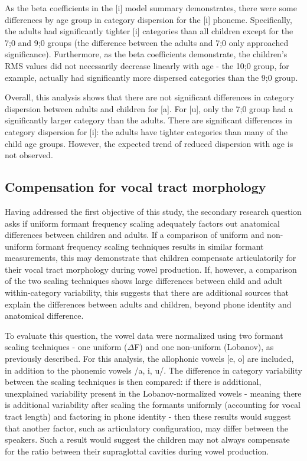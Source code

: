 \documentclass[
]{article}
\begin{document}
As the beta coefficients in the {[}i{]} model summary demonstrates, there were some differences by age group in category dispersion for the {[}i{]} phoneme. Specifically, the adults had significantly tighter {[}i{]} categories than all children except for the 7;0 and 9;0 groups (the difference between the adults and 7;0 only approached significance). Furthermore, as the beta coefficients demonstrate, the children's RMS values did not necessarily decrease linearly with age - the 10;0 group, for example, actually had significantly more dispersed categories than the 9;0 group.

Overall, this analysis shows that there are not significant differences in category dispersion between adults and children for {[}a{]}. For {[}u{]}, only the 7;0 group had a significantly larger category than the adults. There are significant differences in category dispersion for {[}i{]}: the adults have tighter categories than many of the child age groups. However, the expected trend of reduced dispersion with age is not observed.

\hypertarget{compensation-for-vocal-tract-morphology}{%
\subsection{Compensation for vocal tract morphology}\label{compensation-for-vocal-tract-morphology}}

Having addressed the first objective of this study, the secondary research question asks if uniform formant frequency scaling adequately factors out anatomical differences between children and adults. If a comparison of uniform and non-uniform formant frequency scaling techniques results in similar formant measurements, this may demonstrate that children compensate articulatorily for their vocal tract morphology during vowel production. If, however, a comparison of the two scaling techniques shows large differences between child and adult within-category variability, this suggests that there are additional sources that explain the differences between adults and children, beyond phone identity and anatomical difference.

To evaluate this question, the vowel data were normalized using two formant scaling techniques - one uniform (\(\Delta\)F) and one non-uniform (Lobanov), as previously described. For this analysis, the allophonic vowels {[}e, o{]} are included, in addition to the phonemic vowels /a, i, u/. The difference in category variability between the scaling techniques is then compared: if there is additional, unexplained variability present in the Lobanov-normalized vowels - meaning there is additional variability after scaling the formants uniformly (accounting for vocal tract length) and factoring in phone identity - then these results would suggest that another factor, such as articulatory configuration, may differ between the speakers. Such a result would suggest the children may not always compensate for the ratio between their supraglottal cavities during vowel production.
\end{document}
